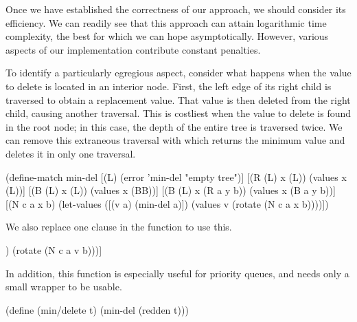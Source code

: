 \documentclass[preprint]{sigplanconf}
\begin{document}
Once we have established the correctness of our approach, we should consider its efficiency. We can readily see that this approach can attain logarithmic time complexity, the best for which we can hope asymptotically. However, various aspects of our implementation contribute constant penalties.

To identify a particularly egregious aspect, consider what happens when the value to delete is located in an interior node. First, the left edge of its right child is traversed to obtain a replacement value. That value is then deleted from the right child, causing another traversal. This is costliest when the value to delete is found in the root node; in this case, the depth of the entire tree is traversed twice. We can remove this extraneous traversal with  which returns the minimum value and deletes it in only one traversal.
\begin{schemedisplay}
(define-match min-del
  [(L) (error 'min-del "empty tree")]
  [(R (L) x (L)) (values x (L))]
  [(B (L) x (L)) (values x (BB))]
  [(B (L) x (R a y b)) (values x (B a y b))]
  [(N c a x b) (let-values ([(v a) (min-del a)])
                 (values v (rotate (N c a x b))))])
\end{schemedisplay}
We also replace one clause in the  function to use this.
\begin{schemedisplay}
[= (let-values ([(v b) (min-del b)])
     (rotate (N c a v b)))]
\end{schemedisplay}
In addition, this function is especially useful for priority queues, and needs only a small wrapper to be usable.
\begin{schemedisplay}
  (define (min/delete t)
    (min-del (redden t)))
\end{schemedisplay}
\end{document}
